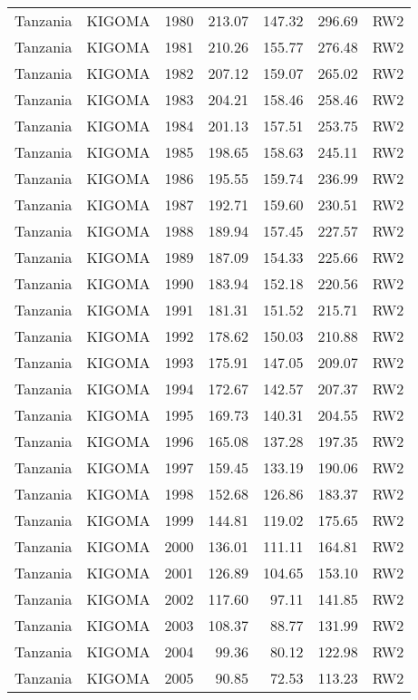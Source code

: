 \begin{longtable}{lllrrrl}
  Tanzania & KIGOMA & 1980 & 213.07 & 147.32 & 296.69 & RW2 \\ 
  Tanzania & KIGOMA & 1981 & 210.26 & 155.77 & 276.48 & RW2 \\ 
  Tanzania & KIGOMA & 1982 & 207.12 & 159.07 & 265.02 & RW2 \\ 
  Tanzania & KIGOMA & 1983 & 204.21 & 158.46 & 258.46 & RW2 \\ 
  Tanzania & KIGOMA & 1984 & 201.13 & 157.51 & 253.75 & RW2 \\ 
  Tanzania & KIGOMA & 1985 & 198.65 & 158.63 & 245.11 & RW2 \\ 
  Tanzania & KIGOMA & 1986 & 195.55 & 159.74 & 236.99 & RW2 \\ 
  Tanzania & KIGOMA & 1987 & 192.71 & 159.60 & 230.51 & RW2 \\ 
  Tanzania & KIGOMA & 1988 & 189.94 & 157.45 & 227.57 & RW2 \\ 
  Tanzania & KIGOMA & 1989 & 187.09 & 154.33 & 225.66 & RW2 \\ 
  Tanzania & KIGOMA & 1990 & 183.94 & 152.18 & 220.56 & RW2 \\ 
  Tanzania & KIGOMA & 1991 & 181.31 & 151.52 & 215.71 & RW2 \\ 
  Tanzania & KIGOMA & 1992 & 178.62 & 150.03 & 210.88 & RW2 \\ 
  Tanzania & KIGOMA & 1993 & 175.91 & 147.05 & 209.07 & RW2 \\ 
  Tanzania & KIGOMA & 1994 & 172.67 & 142.57 & 207.37 & RW2 \\ 
  Tanzania & KIGOMA & 1995 & 169.73 & 140.31 & 204.55 & RW2 \\ 
  Tanzania & KIGOMA & 1996 & 165.08 & 137.28 & 197.35 & RW2 \\ 
  Tanzania & KIGOMA & 1997 & 159.45 & 133.19 & 190.06 & RW2 \\ 
  Tanzania & KIGOMA & 1998 & 152.68 & 126.86 & 183.37 & RW2 \\ 
  Tanzania & KIGOMA & 1999 & 144.81 & 119.02 & 175.65 & RW2 \\ 
  Tanzania & KIGOMA & 2000 & 136.01 & 111.11 & 164.81 & RW2 \\ 
  Tanzania & KIGOMA & 2001 & 126.89 & 104.65 & 153.10 & RW2 \\ 
  Tanzania & KIGOMA & 2002 & 117.60 & 97.11 & 141.85 & RW2 \\ 
  Tanzania & KIGOMA & 2003 & 108.37 & 88.77 & 131.99 & RW2 \\ 
  Tanzania & KIGOMA & 2004 & 99.36 & 80.12 & 122.98 & RW2 \\ 
  Tanzania & KIGOMA & 2005 & 90.85 & 72.53 & 113.23 & RW2 \\ 

\end{longtable}
